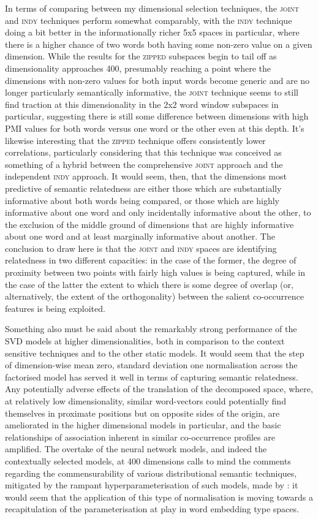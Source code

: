 In terms of comparing between my dimensional selection techniques, the \textsc{joint} and \textsc{indy} techniques perform somewhat comparably, with the \textsc{indy} technique doing a bit better in the informationally richer 5x5 spaces in particular, where there is a higher chance of two words both having some non-zero value on a given dimension.  While the results for the \textsc{zipped} subspaces begin to tail off as dimensionality approaches 400, presumably reaching a point where the dimensions with non-zero values for both input words become generic and are no longer particularly semantically informative, the \textsc{joint} technique seems to still find traction at this dimensionality in the 2x2 word window subspaces in particular, suggesting there is still some difference between dimensions with high PMI values for both words versus one word or the other even at this depth.  It's likewise interesting that the \textsc{zipped} technique offers consistently lower correlations, particularly considering that this technique was conceived as something of a hybrid between the comprehensive \textsc{joint} approach and the independent \textsc{indy} approach.  It would seem, then, that the dimensions most predictive of semantic relatedness are either those which are substantially informative about both words being compared, or those which are highly informative about one word and only incidentally informative about the other, to the exclusion of the middle ground of dimensions that are highly informative about one word and at least marginally informative about another.  The conclusion to draw here is that the \textsc{joint} and \textsc{indy} spaces are identifying relatedness in two different capacities: in the case of the former, the degree of proximity between two points with fairly high values is being captured, while in the case of the latter the extent to which there is some degree of overlap (or, alternatively, the extent of the orthogonality) between the salient co-occurrence features is being exploited.

Something also must be said about the remarkably strong performance of the SVD models at higher dimensionalities, both in comparison to the context sensitive techniques and to the other static models.  It would seem that the step of dimension-wise mean zero, standard deviation one normalisation across the factorised model has served it well in terms of capturing semantic relatedness.  Any potentially adverse effects of the translation of the decomposed space, where, at relatively low dimensionality, similar word-vectors could potentially find themselves in proximate positions but on opposite sides of the origin, are ameliorated in the higher dimensional models in particular, and the basic relationships of association inherent in similar co-occurrence profiles are amplified.  The overtake of the neural network models, and indeed the contextually selected models, at 400 dimensions calls to mind the comments regarding the commensurability of various distributional semantic techniques, mitigated by the rampant hyperparameterisation of such models, made by \cite{LevyEA2014b}: it would seem that the application of this type of normalisation is moving towards a recapitulation of the parameterisation at play in word embedding type spaces.


